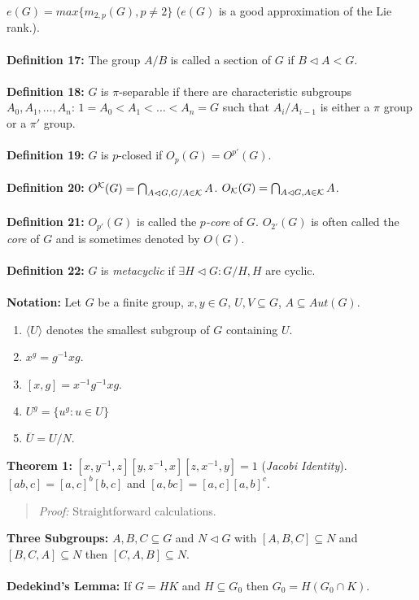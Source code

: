 $e(G) = max \{ m_{2,p} (G), p \ne 2 \}$ ($e(G)$ is a good approximation of
the Lie rank.).
\\
\\
{\bf Definition 17:} The group $A/B$ is called a section of $G$ if $B \lhd A <G$.
\\
\\
{\bf Definition 18:} $G$ is $\pi$-separable if there are characteristic subgroups
$A_0, A_1, \ldots , A_n$: $1=A_0<A_1<\ldots<A_n=G$ such that $A_i/A_{i-1}$ is
either a $\pi$ group or a $\pi'$ group.
\\
\\
{\bf Definition 19:} $G$ is $p$-closed if $O_p(G)= O^{p'}(G)$.
\\
\\
{\bf Definition 20:} 
$O^{\cal K}(G)= \bigcap_{A \lhd G, G/A \in {\cal K}} A$.
$O_{\cal K}(G)= \bigcap_{A \lhd G, A \in {\cal K}} A$.
\\
\\
{\bf Definition 21:}
$O_{p'}(G)$ is called the $p$\emph{-core} of $G$. $O_{2'}(G)$ is often called the
\emph{core} of $G$ and is sometimes denoted by $O(G)$.
\\
\\
{\bf Definition 22:}
$G$ is 
\emph{metacyclic} if $\exists H \lhd G: G/H ,H$ are cyclic. 
\\
\\
{\bf Notation:}  Let $G$ be a finite group, $x, y \in G$, $U, V \subseteq G$,
$A \subseteq Aut(G)$.
\begin{enumerate}
\item $ \langle U \rangle $ denotes the smallest subgroup of $G$ containing $U$.
\item $x^g= g^{-1}xg$.
\item $[x,g]= x^{-1} g^{-1} x g$.
\item $U^g= \{ u^g: u \in U \}$
\item ${\overline U} = U/N$.
\end{enumerate}
{\bf Theorem 1:}
$ [x, y^{-1}, z] [y, z^{-1}, x] [z, x^{-1}, y]=1$
(\emph{Jacobi Identity}).
$[ab,c]= [a,c]^b [b,c]$ and $[a,bc]=[a,c] [a,b]^c$.  
\begin{quote}
\emph{Proof:} Straightforward calculations.
\end{quote}
{\bf Three Subgroups:} $A, B, C \subseteq G$ and
$N \lhd G$ with
$[A,B,C] \subseteq N$ and
$[B,C,A] \subseteq N$ then
$[C,A,B] \subseteq N$.
\\
\\
{\bf Dedekind's Lemma:}  If $G=HK$ and $H \subseteq G_0$ then $G_0 = H(G_0 \cap K)$.
